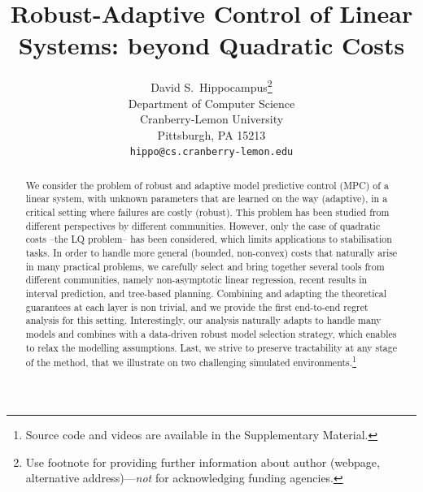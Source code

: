 \documentclass{article}
\title{Robust-Adaptive Control of Linear Systems: beyond Quadratic Costs}
\author{%
	David S.~Hippocampus\thanks{Use footnote for providing further information
		about author (webpage, alternative address)---\emph{not} for acknowledging
		funding agencies.} \\
	Department of Computer Science\\
	Cranberry-Lemon University\\
	Pittsburgh, PA 15213 \\
	\texttt{hippo@cs.cranberry-lemon.edu} \\
}
\begin{document}
	
\maketitle

\begin{abstract}
We consider the problem of robust and adaptive model predictive control (MPC) of a linear system, with unknown parameters that are learned on the way (adaptive), in a critical setting where failures are costly (robust).
This problem has been studied from different perspectives by different communities. However, only the case of quadratic costs --the LQ problem-- has been considered, which limits applications to stabilisation tasks. In order to handle more general (bounded, non-convex) costs that naturally arise in many practical problems,
we carefully select and bring together several tools from different communities, namely non-asymptotic linear regression, recent results in interval prediction, and tree-based planning. 
Combining and adapting the theoretical guarantees at each layer is non trivial, and we provide the first end-to-end regret analysis for this setting.  
Interestingly, our analysis naturally adapts to handle many models and combines with a data-driven robust model selection strategy, which enables to relax the modelling assumptions.
Last, we strive to preserve tractability at any stage of the method, that we illustrate on two challenging simulated environments.\footnote{Source code and videos are available in the Supplementary Material.}
\end{abstract}	
\end{document}
